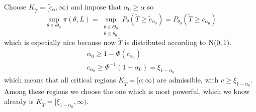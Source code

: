 \documentclass[12pt]{extarticle}
\newcommand{\Normal}{{\operatorfont N}}
\begin{document}
Choose $K_{\tilde T} = [ \tilde c_\alpha, \infty )$ and impose that $\alpha_0 \geq \alpha$ so
\begin{equation}
	\sup_{\theta \in \Theta_0} \pi(\theta, L) = \sup_{\substack{\theta \in \Theta_0 \\ \theta \leq \theta_0}} P_\theta (\tilde T \geq \tilde c_{\alpha_0}) = P_{\theta_0}(\tilde T \geq c_{\alpha_0})
\end{equation}
which is especially nice because now $\tilde T$ is distributed according to $\Normal(0,1)$.
\begin{gather}
	\alpha_0 \geq 1- \Phi(c_{\alpha_0}) \\
	c_{\alpha_0} \geq \Phi^{-1}(1- \alpha_0) = \xi_{1-\alpha_0}
\end{gather}
which means that all critical regions $K_{\tilde T} = [c; \infty)$ are admissible, with $c \geq \xi_{1 - \alpha_0}$.
Among these regions we choose the one which is most powerful, which we know already is $K_{\tilde T} = [\xi_{1-\alpha_0}, \infty)$.
\end{document}
